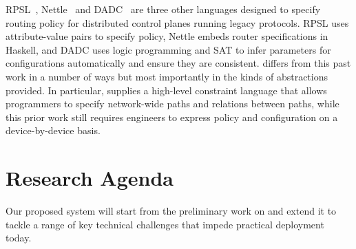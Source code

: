 RPSL~\cite{rpsl}, Nettle~\cite{nettle} and DADC~\cite{dadc} are three
other languages designed to specify routing policy for distributed control planes
running legacy protocols.  RPSL uses attribute-value pairs to specify policy,
Nettle embeds router specifications in Haskell, and DADC uses logic programming
and SAT to infer parameters for configurations automatically and ensure they
are consistent.  \Propane differs from this past work in a number of ways but most
importantly in the kinds of abstractions provided.  In particular, \Propane supplies
a high-level constraint language that allows programmers to specify
network-wide paths and relations between paths, while this prior work still requires engineers to express policy and configuration on a device-by-device basis.




\section{Research Agenda}
\label{sec:research}

Our proposed \Name system will start from the preliminary work on \Propane and extend it to tackle a range of key technical challenges that impede practical deployment today.

